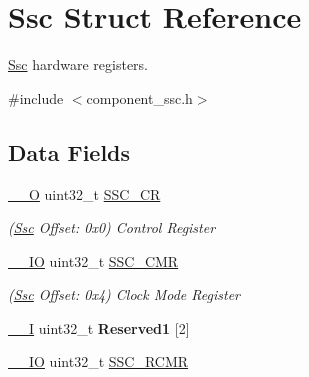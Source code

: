 \hypertarget{structSsc}{}\section{Ssc Struct Reference}
\label{structSsc}


\mbox{\hyperlink{structSsc}{Ssc}} hardware registers.  




{\ttfamily \#include $<$component\+\_\+ssc.\+h$>$}

\subsection*{Data Fields}
\begin{DoxyCompactItemize}
\item 
\mbox{\label{structSsc_aa0b0c6253e27ca39b8edb766bc24a330}} 
\mbox{\hyperlink{core__cm7_8h_a7e25d9380f9ef903923964322e71f2f6}{\+\_\+\+\_\+O}} uint32\+\_\+t \mbox{\hyperlink{structSsc_aa0b0c6253e27ca39b8edb766bc24a330}{S\+S\+C\+\_\+\+CR}}
\begin{DoxyCompactList}\small\item\em (\mbox{\hyperlink{structSsc}{Ssc}} Offset\+: 0x0) Control Register \end{DoxyCompactList}\item 
\mbox{\label{structSsc_ae020d7fe7643d133f47e6509765f175c}} 
\mbox{\hyperlink{core__cm7_8h_aec43007d9998a0a0e01faede4133d6be}{\+\_\+\+\_\+\+IO}} uint32\+\_\+t \mbox{\hyperlink{structSsc_ae020d7fe7643d133f47e6509765f175c}{S\+S\+C\+\_\+\+C\+MR}}
\begin{DoxyCompactList}\small\item\em (\mbox{\hyperlink{structSsc}{Ssc}} Offset\+: 0x4) Clock Mode Register \end{DoxyCompactList}\item 
\mbox{\label{structSsc_ab35153471cda19881d99f687242ae457}} 
\mbox{\hyperlink{core__cm7_8h_af63697ed9952cc71e1225efe205f6cd3}{\+\_\+\+\_\+I}} uint32\+\_\+t {\bfseries Reserved1} \mbox{[}2\mbox{]}
\item 
\mbox{\label{structSsc_ab9f896ca819c340112e7aa6a0fbecb92}} 
\mbox{\hyperlink{core__cm7_8h_aec43007d9998a0a0e01faede4133d6be}{\+\_\+\+\_\+\+IO}} uint32\+\_\+t \mbox{\hyperlink{structSsc_ab9f896ca819c340112e7aa6a0fbecb92}{S\+S\+C\+\_\+\+R\+C\+MR}}

\end{DoxyCompactItemize}
